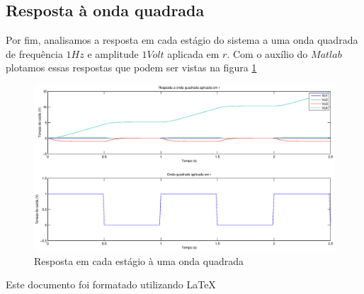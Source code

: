 \documentclass{article}
\begin{document}
\subsection{Resposta à onda quadrada}
Por fim, analisamos a resposta em cada estágio do sistema a uma onda quadrada de frequência $1Hz$ e amplitude $1Volt$ aplicada em $r$. Com o auxílio do $Matlab$ plotamos essas respostas que podem ser vistas na figura \ref{fig:resposta}
\begin{figure}[H]
\centering
\includegraphics[width=\linewidth, height=0.8\linewidth]{resposta}
\caption{Resposta em cada estágio à uma onda quadrada}
\label{fig:resposta}
\end{figure}

\begin{thebibliography}{widestlabel}
\end{thebibliography}
\tiny{Este documento foi formatado utilizando \LaTeX}
\end{document}
